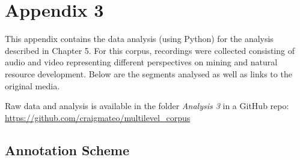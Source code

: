 \chapter{Appendix 3}
This appendix contains the data analysis (using Python) for the analysis described in Chapter 5. For this corpus, recordings were collected consisting of audio and video representing different perspectives on mining and natural resource development. Below are the segments analysed as well as links to the original media.


Raw data and analysis is available in the folder \textit{Analysis 3} in a GitHub repo: \href{https://github.com/craigmateo/multilevel_corpus}{https://github.com/craigmateo/multilevel\_corpus}

\section{Annotation Scheme}

